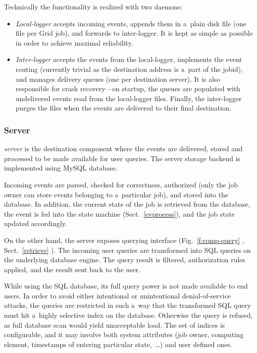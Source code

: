 Technically the functionality is realized with two daemons:
\begin{itemize}
\item \emph{Local-logger} accepts incoming events,
appends them in a~plain disk file (one file per Grid job),
and forwards to inter-logger.
It is kept as simple as possible in order to achieve
maximal reliability. 
\item \emph{Inter-logger} accepts the events from the local-logger,
implements the event routing (currently trivial as the destination
address is a~part of the jobid), and manages
delivery queues (one per destination server).
It is also responsible for crash recovery---on startup, the queues are
populated with undelivered events read from the local-logger files.
Finally, the inter-logger purges the files when the events are delivered to
their final destination.
\end{itemize}

\subsubsection{Server}
\label{server}
\emph{\LB server} is the destination component where the events are delivered,
stored and processed to be made available for user queries.
The server storage backend is implemented using MySQL database.

Incoming events are parsed, checked for correctness, authorized (only the job
owner can store events belonging to a~particular job), and stored into the
database.
In addition, the current state of the job is retrieved from the database,
the event is fed
into the state machine 
\ifx\insideUG\undefined\relax\else
(Sect.~\ref{evprocess}),
\fi
and the job state updated
accordingly.

On the other hand, the server exposes querying interface (Fig.~\ref{f:comp-query}%
\ifx\insideUG\undefined\relax\else
, Sect.~\ref{retrieve}
\fi
).
The incoming user queries are transformed into SQL queries on the underlying
database engine.
The query result is filtered, authorization rules applied, and the result
sent back to the user.

While using the SQL database, its full query power is not made available
to end users. 
In order to avoid either intentional or unintentional denial-of-service
attacks, the queries are restricted in such a~way that the transformed SQL
query must hit a~highly selective index on the database.
Otherwise the query is refused, as full database scan would yield unacceptable
load.
The set of indices is configurable, and it may involve both \LB system
attributes (\eg job owner, computing element,
timestamps of entering particular state,~\dots) and user defined ones.

